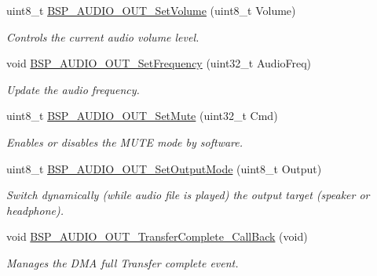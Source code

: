 \begin{DoxyCompactItemize}
uint8\+\_\+t \mbox{\hyperlink{group___s_t_m32_f4___d_i_s_c_o_v_e_r_y___a_u_d_i_o___o_u_t___exported___functions_ga2929e2c81c7ca31f8f52622a06ab4900}{B\+S\+P\+\_\+\+A\+U\+D\+I\+O\+\_\+\+O\+U\+T\+\_\+\+Set\+Volume}} (uint8\+\_\+t Volume)
\begin{DoxyCompactList}\small\item\em Controls the current audio volume level. \end{DoxyCompactList}\item 
void \mbox{\hyperlink{group___s_t_m32_f4___d_i_s_c_o_v_e_r_y___a_u_d_i_o___o_u_t___exported___functions_gaf9159656c0f4dde08c62334a25d4b106}{B\+S\+P\+\_\+\+A\+U\+D\+I\+O\+\_\+\+O\+U\+T\+\_\+\+Set\+Frequency}} (uint32\+\_\+t Audio\+Freq)
\begin{DoxyCompactList}\small\item\em Update the audio frequency. \end{DoxyCompactList}\item 
uint8\+\_\+t \mbox{\hyperlink{group___s_t_m32_f4___d_i_s_c_o_v_e_r_y___a_u_d_i_o___o_u_t___exported___functions_ga6f0fdfb8396ba31eaebb8ff530de3dd3}{B\+S\+P\+\_\+\+A\+U\+D\+I\+O\+\_\+\+O\+U\+T\+\_\+\+Set\+Mute}} (uint32\+\_\+t Cmd)
\begin{DoxyCompactList}\small\item\em Enables or disables the M\+U\+TE mode by software. \end{DoxyCompactList}\item 
uint8\+\_\+t \mbox{\hyperlink{group___s_t_m32_f4___d_i_s_c_o_v_e_r_y___a_u_d_i_o___o_u_t___exported___functions_gacd0d9e6eb0ff2569cf6c4b92fc359484}{B\+S\+P\+\_\+\+A\+U\+D\+I\+O\+\_\+\+O\+U\+T\+\_\+\+Set\+Output\+Mode}} (uint8\+\_\+t Output)
\begin{DoxyCompactList}\small\item\em Switch dynamically (while audio file is played) the output target (speaker or headphone). \end{DoxyCompactList}\item 
\mbox{\label{group___s_t_m32_f4___d_i_s_c_o_v_e_r_y___a_u_d_i_o___o_u_t___exported___functions_gaf7880d05162512445bf68d4fa9d303e2}} 
void \mbox{\hyperlink{group___s_t_m32_f4___d_i_s_c_o_v_e_r_y___a_u_d_i_o___o_u_t___exported___functions_gaf7880d05162512445bf68d4fa9d303e2}{B\+S\+P\+\_\+\+A\+U\+D\+I\+O\+\_\+\+O\+U\+T\+\_\+\+Transfer\+Complete\+\_\+\+Call\+Back}} (void)
\begin{DoxyCompactList}\small\item\em Manages the D\+MA full Transfer complete event. \end{DoxyCompactList}\item 

\end{DoxyCompactItemize}
